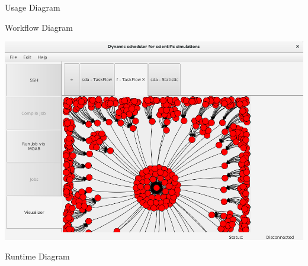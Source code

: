 \begin{frame}{Usage Diagram}
	
\end{frame}
	
\begin{frame}{Workflow Diagram}
	\centerline{
		\includegraphics[scale=0.32]{images/taskflow}}
\end{frame}

\begin{frame}{Runtime Diagram}
	
\end{frame}
